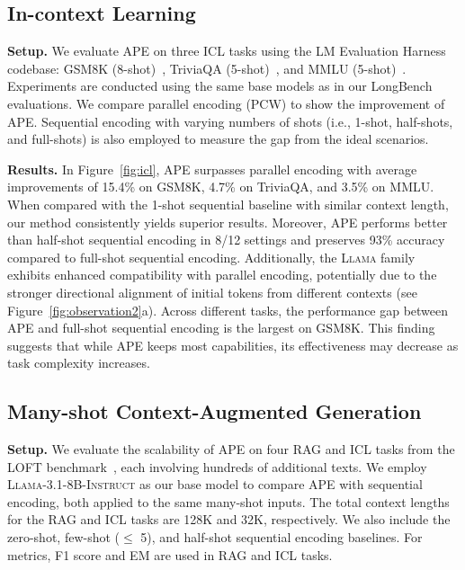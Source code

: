 \subsection{In-context Learning}
\label{icl}

\textbf{Setup.} We evaluate APE on three ICL tasks using the LM Evaluation Harness~\citep{eval-harness} codebase: GSM8K (8-shot)~\citep{cobbe2021training}, TriviaQA (5-shot)~\citep{joshi2017triviaqa}, and MMLU (5-shot)~\citep{hendrycks2020measuring}. Experiments are conducted using the same base models as in our LongBench evaluations. We compare parallel encoding (PCW) to show the improvement of APE. Sequential encoding with varying numbers of shots (i.e., 1-shot, half-shots, and full-shots) is also employed to measure the gap from the ideal scenarios.

\textbf{Results.} In Figure~\ref{fig:icl}, APE surpasses parallel encoding with average improvements of 15.4\% on GSM8K, 4.7\% on TriviaQA, and 3.5\% on MMLU. When compared with the 1-shot sequential baseline with similar context length, our method consistently yields superior results. Moreover, APE performs better than half-shot sequential encoding in 8/12 settings and preserves 93\% accuracy compared to full-shot sequential encoding. Additionally, the \textsc{Llama} family exhibits enhanced compatibility with parallel encoding, potentially due to the stronger directional alignment of initial tokens from different contexts (see Figure~\ref{fig:observation2}a). Across different tasks, the performance gap between APE and full-shot sequential encoding is the largest on GSM8K. This finding suggests that while APE keeps most capabilities, its effectiveness may decrease as task complexity increases.



\subsection{Many-shot Context-Augmented Generation}
\label{sec:loft}



\textbf{Setup.} We evaluate the scalability of APE on four RAG and ICL tasks from the LOFT benchmark~\citep{lee2024can}, each involving hundreds of additional texts. We employ \textsc{Llama-3.1-8B-Instruct} as our base model to compare APE with sequential encoding, both applied to the same many-shot inputs. The total context lengths for the RAG and ICL tasks are 128K and 32K, respectively. We also include the zero-shot, few-shot ($\leq$ 5), and half-shot sequential encoding baselines. For metrics, F1 score and EM are used in RAG and ICL tasks.

